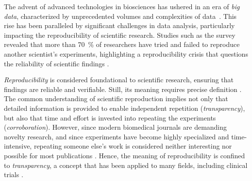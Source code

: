 %
\label{sec:intro_nontransparencies}%
The advent of advanced technologies in biosciences has ushered in an era of \emph{big
    data}, characterized by unprecedented volumes and complexities of
data~\cite{bubendorfHighthroughputMicroarrayTechnologies2001, yangScalabilityValidationBig2017,
    ekmekciIntroductionProgrammingBioscientists2016}. This rise has been paralleled
by significant challenges in data analysis, particularly impacting the
reproducibility of scientific research. Studies such as the
\citet{baker500ScientistsLift2016} survey revealed that more than
\SI{70}{\percent} of researchers have tried and failed to reproduce another
scientist's experiments, highlighting a reproducibility crisis that questions
the reliability of scientific findings
\cite{begleyReproducibilityScienceImproving2015, ioannidisWhyMostPublished2005}.

\emph{Reproducibility} is considered foundational to scientific research,
ensuring that findings are reliable and verifiable. Still, its meaning requires
precise definition \cite{goodmanWhatDoesResearch2016}. The common understanding
of scientific reproduction implies not only that detailed information is
provided to enable independent repetition (\emph{transparency}), but also that
time and effort is invested into repeating the experiments
(\emph{corroboration}). However, since modern biomedical journals are demanding
novelty research, and since experiments have become highly specialized and
time-intensive, repeating someone else's work is considered neither interesting%
nor possible for most publications \cite{flierProblemIrreproducibleBioscience2022,
    pengReproducibleResearchComputational2011}. Hence, the meaning of
reproducibility is confined to \emph{transparency}, a concept that has
been applied to many fields, including clinical trials
\cite{goodmanWhatDoesResearch2016,
    committeeonstrategiesforresponsiblesharingofclinicaltrialdataSharingClinicalTrial2015}.

